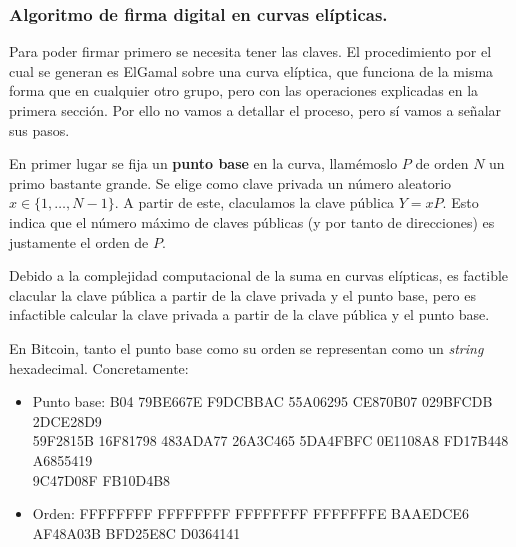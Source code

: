 \documentclass[twoside]{article}
\theoremstyle{definition}
\begin{document}
\subsubsection{Algoritmo de firma digital en curvas elípticas. }

Para poder firmar primero se necesita tener las claves. El procedimiento por el cual se generan es ElGamal sobre una curva elíptica, que funciona de la misma forma que en cualquier otro grupo, pero con las operaciones explicadas en la primera sección.  Por ello no vamos a detallar el proceso, pero sí vamos a señalar sus pasos. 

En primer lugar se fija un \textbf{punto base} en la curva, llamémoslo $P$ de orden $N$ un primo bastante grande. Se elige como clave privada un número aleatorio $x\in\{1,\dots, N-1\}$. A partir de este, claculamos la clave pública $Y=xP$. Esto indica que el número máximo de claves públicas (y por tanto de direcciones) es justamente el orden de $P$. 

Debido a la complejidad computacional de la suma en curvas elípticas, es factible clacular la clave pública a partir de la clave privada y el punto base, pero es infactible calcular la clave privada a partir de la clave pública y el punto base. 

En Bitcoin, tanto el punto base como su orden se representan como un \emph{string} hexadecimal. Concretamente:
\begin{itemize}
\item Punto base: B04 79BE667E F9DCBBAC 55A06295 CE870B07 029BFCDB 2DCE28D9 \\59F2815B 16F81798 483ADA77  26A3C465 5DA4FBFC 0E1108A8 FD17B448 A6855419 \\ 9C47D08F FB10D4B8
\item Orden:  FFFFFFFF FFFFFFFF FFFFFFFF FFFFFFFE BAAEDCE6 AF48A03B BFD25E8C D0364141
\end{itemize}
\end{document}
